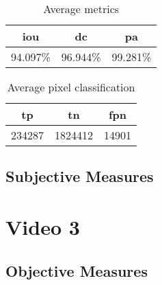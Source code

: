 \begin{minipage}[c]{0.475\textwidth}
\begin{table}[H]
    \centering
    \begin{tabular}{||c c c||} 
        \hline
        \acrshort{iou} & \acrshort{dc} & \acrshort{pa} \\ [0.5ex] 
        \hline\hline
        94.097\% & 96.944\% & 99.281\% \\ [1ex] 
        \hline
    \end{tabular}
    \caption{Average metrics}
    \label{tab:metrics_video_2}
\end{table}
\end{minipage}
\begin{minipage}[c]{0.475\textwidth}
\begin{table}[H]
    \centering
    \begin{tabular}{||c c c||} 
        \hline
        \acrshort{tp} & \acrshort{tn} & \acrshort{fpn} \\ [0.5ex] 
        \hline\hline
        234287 & 1824412 & 14901 \\ [1ex] 
        \hline
    \end{tabular}
    \caption{Average pixel classification}
    \label{tab:pixels_video_11}
\end{table}
\end{minipage}

\subsection{Subjective Measures}


\section{Video 3}
\subsection{Objective Measures}

